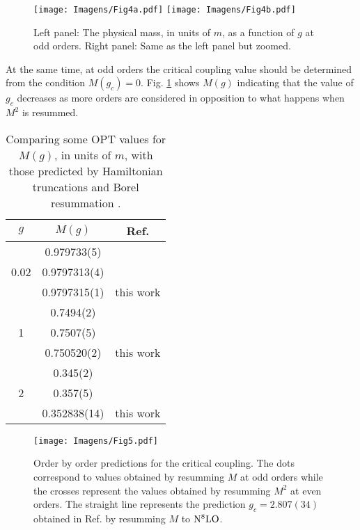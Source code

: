 \documentclass[a4paper,11pt]{article}
\begin{document}
\begin{figure}[ht!]
    \centering
    \texttt{[image: Imagens/Fig4a.pdf]}
    \qquad
     \texttt{[image: Imagens/Fig4b.pdf]}
    \caption{Left panel: The  physical mass, in units of $m$,  as a function of $g$ at odd orders. Right panel: Same as the left panel but zoomed.}
    \label{Fig4}
\end{figure}
At the same time, at odd orders the critical coupling value should be determined from the condition $M(g_c)=0$.  Fig. \ref{Fig4} shows $M(g)$  indicating that the value of $g_c$ decreases as more orders are considered in  opposition to what happens when $M^2$ is resummed. 
\begin{table}[ht!]
    \centering
    \begin{tabular}{ |c||c||c| }
        \hline
        $g$ & $M(g)$ &  Ref. \\
        \hline
        \hline
        {} &0.979733(5) & \cite{hamilton6,hamilton7}  \\ 
        0.02 &0.9797313(4) & \cite{serone1} \\
        {} &0.9797315(1) &  this work \\
        \hline
         {} &0.7494(2)& \cite{hamilton6,hamilton7}  \\ 
        1 &0.7507(5) & \cite{serone1} \\
        {} &0.750520(2) &  this work \\
        \hline
        {} &0.345(2) & \cite{hamilton6,hamilton7}  \\ 
        2 &0.357(5) & \cite{serone1} \\
        {} &0.352838(14) & this work \\
        \hline
    \end{tabular}
    \caption{Comparing some OPT values for $M(g)$, in units of $m$, with those predicted by Hamiltonian truncations \cite {hamilton6,hamilton7} and Borel resummation \cite{serone1}.  }
\label{tabela1}    
\end{table}

 
\begin{figure}[ht!]
    \centering
    \texttt{[image: Imagens/Fig5.pdf]}
    \caption{Order by order predictions for the critical coupling. The dots correspond to values obtained by resumming $M$ at odd orders while the crosses represent the values obtained by resumming $M^2$ at even  orders. The straight line represents the prediction  $g_c = 2.807(34)$ obtained in Ref. \cite {serone1} by resumming $M$ to ${\rm N}^8{\rm LO}$. }
    \label{Fig5}
 \end{figure}   
    
\end{document}
